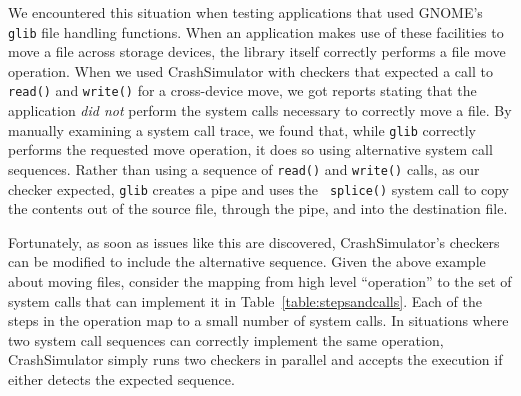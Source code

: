 We encountered this situation when testing applications that used
GNOME's {\tt glib} file handling functions.  When an
application makes use of these facilities to move a file across storage
devices, the library itself correctly performs a
file move operation.  When we used CrashSimulator with
checkers that expected a call to {\tt read()} and {\tt write()}
for a cross-device move, we got reports stating that the
application {\em did not} perform the system calls necessary to
correctly move a file.
By manually
examining a system call trace, we found that, while {\tt glib} correctly
performs the requested move operation,
it does so using alternative system call
sequences.  Rather than using a sequence of {\tt read()} and {\tt write()}
calls, as our checker expected, {\tt glib} creates a pipe and uses the {\tt
splice()} system call to copy the contents out of the source file, through
the pipe, and into the destination file.

Fortunately, as soon as issues like this are discovered,
CrashSimulator's checkers can be modified to include the alternative
sequence.
Given the above example about moving
files, consider the mapping from high level ``operation'' to the set of
system calls that can implement it in Table~\ref{table:stepsandcalls}.
Each of the steps in the operation map to a small number of system calls.
In
situations where two system call sequences can correctly implement the same
operation, CrashSimulator simply runs two checkers in parallel
and accepts the execution if either detects the expected sequence.

